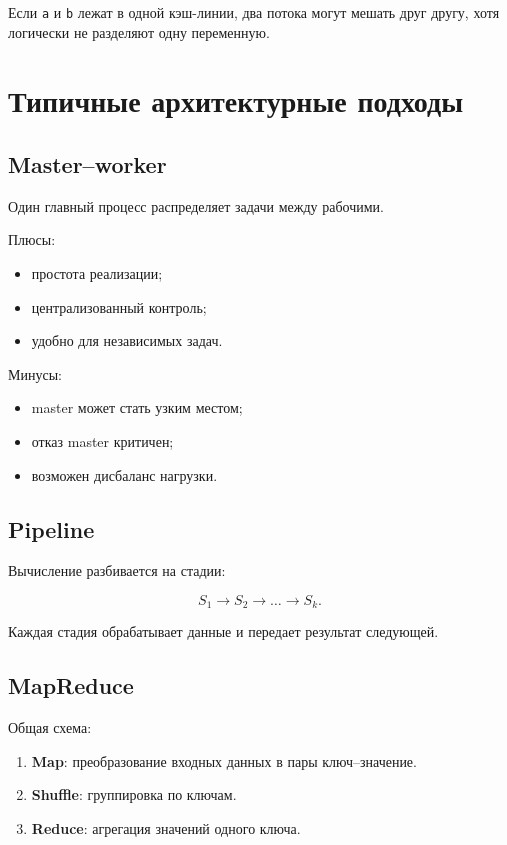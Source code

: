 \documentclass[12pt,a4paper]{article}
\begin{document}
Если \texttt{a} и \texttt{b} лежат в одной кэш-линии, два потока могут мешать друг другу, хотя логически не разделяют одну переменную.

\section{Типичные архитектурные подходы}

\subsection{Master--worker}

Один главный процесс распределяет задачи между рабочими.

Плюсы:
\begin{itemize}
    \item простота реализации;
    \item централизованный контроль;
    \item удобно для независимых задач.
\end{itemize}

Минусы:
\begin{itemize}
    \item master может стать узким местом;
    \item отказ master критичен;
    \item возможен дисбаланс нагрузки.
\end{itemize}

\subsection{Pipeline}

Вычисление разбивается на стадии:

\[
S_1 \rightarrow S_2 \rightarrow \dots \rightarrow S_k.
\]

Каждая стадия обрабатывает данные и передает результат следующей.

\subsection{MapReduce}

Общая схема:
\begin{enumerate}
    \item \textbf{Map}: преобразование входных данных в пары ключ--значение.
    \item \textbf{Shuffle}: группировка по ключам.
    \item \textbf{Reduce}: агрегация значений одного ключа.
\end{enumerate}
\end{document}
